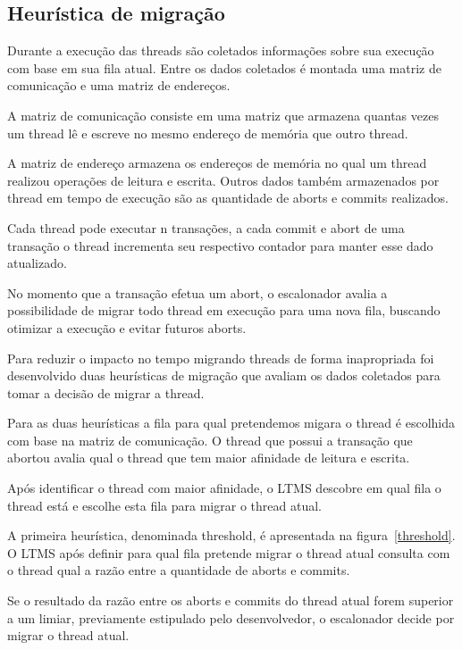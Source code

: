 \documentclass[diss,capa]{texufpel}
\begin{document}
\subsection{Heurística de migração}
\label{migration_heuristic}

Durante a execução das threads são coletados informações sobre sua execução com base em sua fila atual. Entre os dados coletados é montada uma matriz de comunicação e uma matriz de endereços.

A matriz de comunicação consiste em uma matriz que armazena quantas vezes um thread lê e escreve no mesmo endereço de memória que outro thread.

A matriz de endereço armazena os endereços de memória no qual um thread realizou operações de leitura e escrita. Outros dados também armazenados por thread em tempo de execução são as quantidade de aborts e commits realizados.

Cada thread pode executar n transações, a cada commit e abort de uma transação o thread incrementa seu respectivo contador para manter esse dado atualizado.

No momento que a transação efetua um abort, o escalonador avalia a possibilidade de migrar todo thread em execução para uma nova fila, buscando otimizar a execução e evitar futuros aborts.

Para reduzir o impacto no tempo migrando threads de forma inapropriada foi desenvolvido duas heurísticas de migração que avaliam os dados coletados para tomar a decisão de migrar a thread.

Para as duas heurísticas a fila para qual pretendemos migara o thread é escolhida com base na matriz de comunicação. O thread que possui a transação que abortou avalia qual o thread que tem maior afinidade de leitura e escrita.

Após identificar o thread com maior afinidade, o LTMS descobre em qual fila o thread está e escolhe esta fila para migrar o thread atual.

A primeira heurística, denominada threshold, é apresentada na figura~\ref{threshold}. O LTMS após definir para qual fila pretende migrar o thread atual consulta com o thread qual a razão entre a quantidade de aborts e commits.

Se o resultado da razão entre os aborts e commits do thread atual forem superior a um limiar, previamente estipulado pelo desenvolvedor, o escalonador decide por migrar o thread atual.
\end{document}
